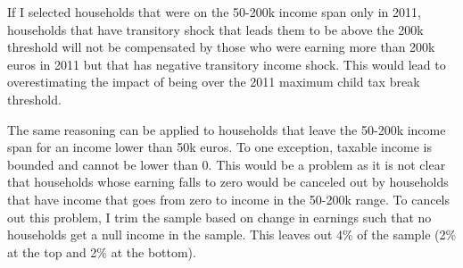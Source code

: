 If I selected households that were on the 50-200k income span only in 2011, households that have transitory shock that leads them to be above the 200k threshold will not be compensated by those who were earning more than 200k euros in 2011 but that has negative transitory income shock. This would lead to overestimating the impact of being over the 2011 maximum child tax break threshold.

The same reasoning can be applied to households that leave the 50-200k income span for an income lower than 50k euros. To one exception, taxable income is bounded and cannot be lower than 0. This would be a problem as it is not clear that households whose earning falls to zero would be canceled out by households that have income that goes from zero to income in the 50-200k range. To cancels out this problem, I trim the sample based on change in earnings such that no households get a null income in the sample. This leaves out 4\% of the sample (2\% at the top and 2\% at the bottom). 







  

